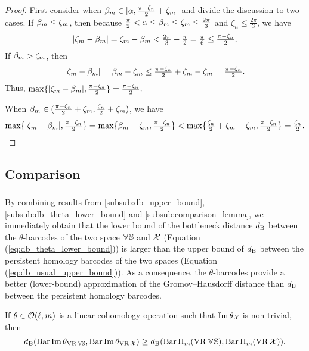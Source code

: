 \begin{proof}
	First consider when $\beta_\degp \in [\alpha, \tfrac{\pi - \zeta_n}{2}+\zeta_\degp]$ and divide the discussion to two cases.
	If $\beta_\degp \leq \zeta_\degp$, then because $\tfrac{\pi}{2} < \alpha \leq \beta_\degp \leq \zeta_\degp  \leq \tfrac{2\pi}{3}$ and $\zeta_n \leq \tfrac{2\pi}{3}$, we have
	\[
	|\zeta_\degp  - \beta_\degp |
	= \zeta_\degp  - \beta_\degp
	< \tfrac{2\pi}{3} - \tfrac{\pi}{2}
	= \tfrac{\pi}{6}
	\leq \tfrac{\pi - \zeta_n}{2}.
	\]
	If $\beta_\degp > \zeta_\degp$, then
	\[
	|\zeta_\degp  - \beta_\degp |
	= \beta_\degp - \zeta_\degp
	\leq \tfrac{\pi - \zeta_n}{2} + \zeta_\degp - \zeta_\degp
	= \tfrac{\pi - \zeta_n}{2}.
	\]
	Thus, $\max\{|\zeta_\degp  - \beta_\degp |, \tfrac{\pi - \zeta_n}{2}\} = \tfrac{\pi - \zeta_n}{2}.$

	When $\beta_\degp \in (\tfrac{\pi - \zeta_n}{2}+\zeta_\degp, \tfrac{\zeta_n}{2}+\zeta_\degp)$, we have
	\[
	\max\{|\zeta_\degp  - \beta_\degp |, \tfrac{\pi - \zeta_n}{2}\}
	= \max\{\beta_\degp - \zeta_\degp, \tfrac{\pi - \zeta_n}{2}\}
	< \max\{\tfrac{\zeta_n}{2}+\zeta_\degp - \zeta_\degp, \tfrac{\pi - \zeta_n}{2}\}
	= \tfrac{\zeta_n}{2} .
	\]
\end{proof}

\subsection{Comparison}
\label{subsub:main_theorem}

\subsubsection{}
By combining results from \cref{subsub:db_upper_bound}, \cref{subsub:db_theta_lower_bound} and \cref{subsub:comparison_lemma}, we immediately obtain that the lower bound of the bottleneck distance $\db$ between the $\theta$-barcodes of the two space $\VS$ and $\cX$ (Equation (\ref{eq:db_theta_lower_bound})) is larger than the upper bound of $\db$ between the persistent homology barcodes of the two spaces (Equation (\ref{eq:db_usual_upper_bound})).
As a consequence, the $\theta$-barcodes provide a better (lower-bound) approximation of the Gromov--Hausdorff distance than $\db$ between the persistent homology barcodes.

\medskip\proposition

If $\theta \in \cO(\ell, \degp)$ is a linear cohomology operation such that $\img \theta_\cX$ is non-trivial, then
\[\db(\thetabarc{\VS}, \thetabarc{\cX}) \geq \db(\Hbarc[\field]{\degp}{\VS}, \Hbarc[\field]{\degp}{\cX}).\]


